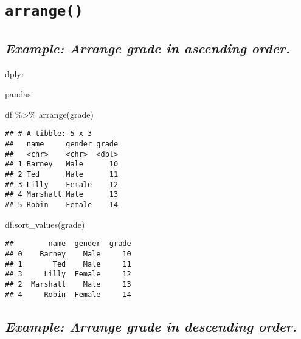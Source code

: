 \documentclass[
]{book}
\newenvironment{Shaded}{\begin{snugshade}}{\end{snugshade}}
\newcommand{\FunctionTok}[1]{\textcolor[rgb]{0.00,0.00,0.00}{#1}}
\newcommand{\NormalTok}[1]{#1}
\newcommand{\SpecialCharTok}[1]{\textcolor[rgb]{0.00,0.00,0.00}{#1}}
\newcommand{\StringTok}[1]{\textcolor[rgb]{0.31,0.60,0.02}{#1}}
\begin{document}
\hypertarget{arrange}{%
\section{\texorpdfstring{\texttt{arrange()}}{arrange()}}\label{arrange}}

\hypertarget{example-arrange-grade-in-ascending-order.}{%
\subsection{\texorpdfstring{\emph{Example: Arrange grade in ascending order.}}{Example: Arrange grade in ascending order.}}\label{example-arrange-grade-in-ascending-order.}}

dplyr

pandas

\begin{Shaded}
\begin{Highlighting}[]
\NormalTok{df }\SpecialCharTok{\%\textgreater{}\%} 
  \FunctionTok{arrange}\NormalTok{(grade)}
\end{Highlighting}
\end{Shaded}

\begin{verbatim}
## # A tibble: 5 x 3
##   name     gender grade
##   <chr>    <chr>  <dbl>
## 1 Barney   Male      10
## 2 Ted      Male      11
## 3 Lilly    Female    12
## 4 Marshall Male      13
## 5 Robin    Female    14
\end{verbatim}

\begin{Shaded}
\begin{Highlighting}[]
\NormalTok{df.sort\_values(}\StringTok{\textquotesingle{}grade\textquotesingle{}}\NormalTok{)}
\end{Highlighting}
\end{Shaded}

\begin{verbatim}
##        name  gender  grade
## 0    Barney    Male     10
## 1       Ted    Male     11
## 3     Lilly  Female     12
## 2  Marshall    Male     13
## 4     Robin  Female     14
\end{verbatim}

\hypertarget{example-arrange-grade-in-descending-order.}{%
\subsection{\texorpdfstring{\emph{Example: Arrange grade in descending order.}}{Example: Arrange grade in descending order.}}\label{example-arrange-grade-in-descending-order.}}
\end{document}
